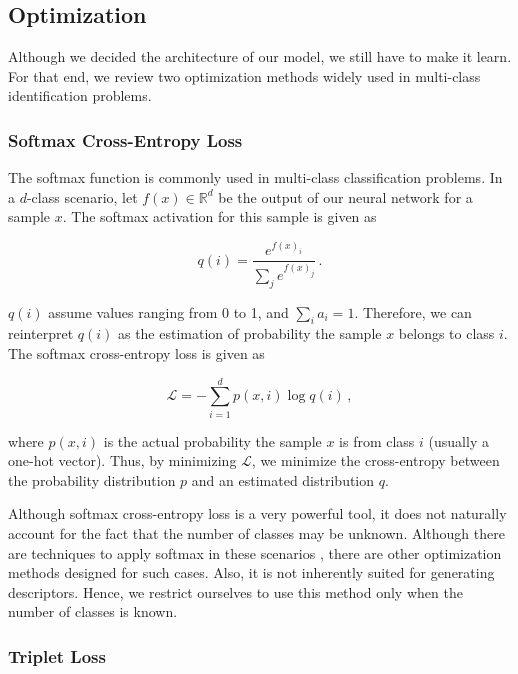 \subsection{Optimization}\label{sec:optimization}
Although we decided the architecture of our model, we still have to make it learn. For that end, we review two optimization methods widely used in multi-class identification problems.

\subsubsection{Softmax Cross-Entropy Loss}\label{sec:softmax}

The softmax function is commonly used in multi-class classification problems. In a $d$-class scenario, let $f(x) \in \mathbb{R}^d$ be the output of our neural network for a sample $x$. The softmax activation for this sample is given as

\begin{equation}
q(i) = \frac{e^{f(x)_i}}{\sum_j e^{f(x)_j}} \,.
\end{equation}

$q(i)$ assume values ranging from 0 to 1, and $\sum_i a_i = 1$. Therefore, we can reinterpret $q(i)$ as the estimation of probability the sample $x$ belongs to class $i$. The softmax cross-entropy loss is given as

\begin{equation}
\mathcal{L} = -\sum_{i=1}^d p(x, i) \log q(i) \,,
\end{equation}

where $p(x, i)$ is the actual probability the sample $x$ is from class $i$ (usually a one-hot vector). Thus, by minimizing $\mathcal{L}$, we minimize the cross-entropy between the probability distribution $p$ and an estimated distribution $q$.

Although softmax cross-entropy loss is a very powerful tool, it does not naturally account for the fact that the number of classes may be unknown. Although there are techniques to apply softmax in these scenarios \cite{softmax_trick1,softmax_trick2}, there are other optimization methods designed for such cases. Also, it is not inherently suited for generating descriptors. Hence, we restrict ourselves to use this method only when the number of classes is known.

\subsubsection{Triplet Loss}\label{sec:triplet}

